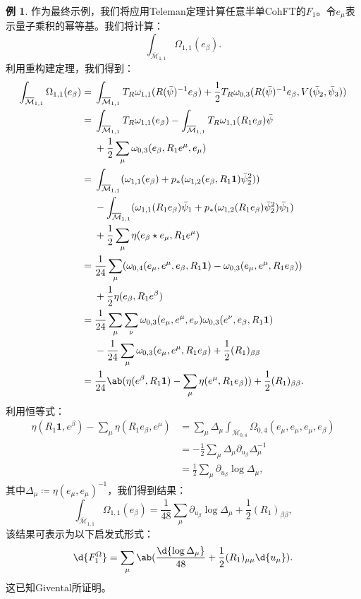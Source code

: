 \documentclass{amsart}
\theoremstyle{definition}
\newtheorem{exm}[thm]{例}
\theoremstyle{remark}
\theoremstyle{plain}
\theoremstyle{definition}
\theoremstyle{remark}
\newcommand{\Mbar}{\overline{\mathcal{M}}}
\newcommand{\1}{\mathbf{1}}
\newcommand{\2}{\mathbf{2}}
\newcommand{\3}{\mathbf{3}}
\begin{document}
\begin{exm}
作为最终示例，我们将应用Teleman定理计算任意半单CohFT的$F_1$。令$e_{\mu}$表示量子乘积的幂等基。我们将计算：
    \[ \int_{\Mbar_{1,1}} \Omega_{1,1}(e_{\beta}). \]
利用重构建定理，我们得到：
    \begin{align*}
        \int_{\Mbar_{1,1}}\Omega_{1,1}(e_{\beta}) ={}& \int_{\Mbar_{1,1}} T_R \omega_{1,1}(R(\bar{\psi})^{-1} e_{\beta}) + \frac{1}{2} T_R \omega_{0,3}(R(\bar{\psi})^{-1} e_{\beta}, V(\bar{\psi}_2, \bar{\psi}_3)) \\
        ={}& \int_{\Mbar_{1,1}}T_R\omega_{1,1}(e_{\beta}) - \int_{\Mbar_{1,1}} T_R \omega_{1,1}(R_1 e_{\beta})\bar{\psi} \\ 
        &+ \frac{1}{2}\sum_{\mu}  \omega_{0,3}(e_{\beta}, R_1 e^{\mu}, e_{\mu}) \\
        ={}& \int_{\Mbar_{1,1}} ( \omega_{1,1}(e_{\beta}) + p_* ( \omega_{1,2}(e_{\beta}, R_1 \1) \bar{\psi}_2^2 )) \\
        &- \int_{\Mbar_{1,1}} (\omega_{1,1}(R_1 e_{\beta})\bar{\psi}_1 + p_* ( \omega_{1,2}(R_1 e_{\beta}) \bar{\psi}_2^2 ) \bar{\psi}_1) \\
        &+ \frac{1}{2} \sum_{\mu} \eta(e_{\beta} \star e_{\mu}, R_1 e^{\mu}) \\
        ={}& \frac{1}{24} \sum_{\mu} ( \omega_{0,4}(e_{\mu}, e^{\mu}, e_{\beta}, R_1 \1) -\omega_{0,3}(e_{\mu}, e^{\mu}, R_1 e_{\beta}) )\\
        &+ \frac{1}{2} \eta(e_{\beta}, R_1 e^{\beta}) \\
        ={}& \frac{1}{24} \sum_{\mu}\sum_{\nu} \omega_{0,3}(e_{\mu}, e^{\mu}, e_{\nu})\omega_{0,3}(e^{\nu}, e_{\beta}, R_1 \1) \\
        &-\frac{1}{24} \sum_{\mu} \omega_{0,3}(e_{\mu}, e^{\mu}, R_1 e_{\beta}) + \frac{1}{2} (R_1)_{\beta\beta} \\
        ={}& \frac{1}{24} \ab(\eta(e^{\beta}, R_1 \1) - \sum_{\mu} \eta(e^{\mu}, R_1 e_{\beta})) + \frac{1}{2} (R_1)_{\beta\beta}.
    \end{align*}
利用恒等式：
    \begin{align*}
        \eta(R_1 \1, e^{\beta}) - \sum_{\mu} \eta(R_1 e_{\beta}, e^{\mu}) &= \sum_{\mu} \Delta_{\mu} \int_{\Mbar_{0,4}} \Omega_{0,4}(e_{\mu}, e_{\mu}, e_{\mu}, e_{\beta}) \\
        &= -\frac{1}{2}\sum_{\mu} \Delta_{\mu} \partial_{u_{\beta}} \Delta_{\mu}^{-1} \\
        &= \frac{1}{2} \sum_{\mu} \partial_{u_{\beta}} \log \Delta_{\mu},
    \end{align*}
其中$\Delta_{\mu} \coloneqq \eta(e_{\mu}, e_{\mu})^{-1}$，我们得到结果：
    \[ \int_{\Mbar_{1,1}} \Omega_{1,1}(e_{\beta}) = \frac{1}{48} \sum_{\mu} \partial_{u_{\beta}} \log \Delta_{\mu} + \frac{1}{2} (R_1)_{\beta\beta}, \]
该结果可表示为以下启发式形式：
    \[ \d{F_1^{\Omega}} = \sum_{\mu} \ab( \frac{\d{\log \Delta_{\mu}}}{48} + \frac{1}{2} (R_1)_{\mu\mu} \d{u_{\mu}} ). \]
这已知Givental所证明。
\end{exm}
\end{document}
